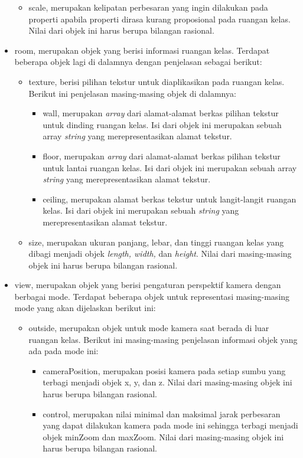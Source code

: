 \begin{itemize}
\begin{itemize}
		\item scale, merupakan kelipatan perbesaran yang ingin dilakukan pada properti apabila properti dirasa kurang proposional pada ruangan kelas. Nilai dari objek ini harus berupa bilangan rasional.
	\end{itemize}
	\item room, merupakan objek yang berisi informasi ruangan kelas. Terdapat beberapa objek lagi di dalamnya dengan penjelasan sebagai berikut:
		\begin{itemize}
			\item texture, berisi pilihan tekstur untuk diaplikasikan pada ruangan kelas. Berikut ini penjelasan masing-masing objek di dalamnya:
			\begin{itemize}
				\item wall, merupakan {\it array} dari alamat-alamat berkas pilihan tekstur untuk dinding ruangan kelas. Isi dari objek ini merupakan sebuah array {\it string} yang merepresentasikan alamat tekstur.
				\item floor, merupakan {\it array} dari alamat-alamat berkas pilihan tekstur untuk lantai ruangan kelas. Isi dari objek ini merupakan sebuah array {\it string} yang merepresentasikan alamat tekstur.
				\item ceiling, merupakan alamat berkas tekstur untuk langit-langit ruangan kelas. Isi dari objek ini merupakan sebuah {\it string} yang merepresentasikan alamat tekstur.
			\end{itemize}
			\item size, merupakan ukuran panjang, lebar, dan tinggi ruangan kelas yang dibagi menjadi objek {\it length, width,} dan {\it height}. Nilai dari masing-masing objek ini harus berupa bilangan rasional.
		\end{itemize}
	\item view, merupakan objek yang berisi pengaturan perspektif kamera dengan berbagai mode. Terdapat beberapa objek untuk representasi masing-masing mode yang akan dijelaskan berikut ini:
		\begin{itemize}
			\item outside, merupakan objek untuk mode kamera saat berada di luar ruangan kelas. Berikut ini masing-masing penjelasan informasi objek yang ada pada mode ini:
			\begin{itemize}
				\item cameraPosition, merupakan posisi kamera pada setiap sumbu yang terbagi menjadi objek x, y, dan z. Nilai dari masing-masing objek ini harus berupa bilangan rasional.
				\item control, merupakan nilai minimal dan maksimal jarak perbesaran yang dapat dilakukan kamera pada mode ini sehingga terbagi menjadi objek minZoom dan maxZoom. Nilai dari masing-masing objek ini harus berupa bilangan rasional.

\end{itemize}
\end{itemize}
\end{itemize}
